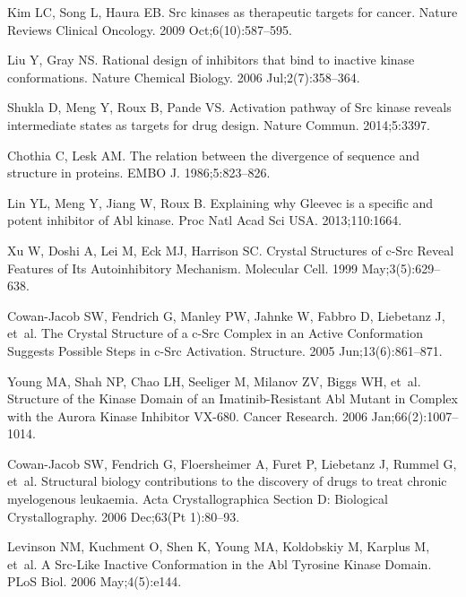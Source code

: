 \documentclass[10pt,letterpaper]{article}
\begin{document}
\begin{thebibliography}{100}
Kim LC, Song L, Haura EB.
\newblock Src kinases as therapeutic targets for cancer.
\newblock Nature Reviews Clinical Oncology. 2009 Oct;6(10):587--595.

Liu Y, Gray NS.
\newblock Rational design of inhibitors that bind to inactive kinase
  conformations.
\newblock Nature Chemical Biology. 2006 Jul;2(7):358--364.

Shukla D, Meng Y, Roux B, Pande VS.
\newblock Activation pathway of {Src} kinase reveals intermediate states as
  targets for drug design.
\newblock Nature Commun. 2014;5:3397.

Chothia C, Lesk AM.
\newblock The relation between the divergence of sequence and structure in
  proteins.
\newblock EMBO J. 1986;5:823--826.

Lin YL, Meng Y, Jiang W, Roux B.
\newblock Explaining why {Gleevec} is a specific and potent inhibitor of {Abl}
  kinase.
\newblock Proc Natl Acad Sci USA. 2013;110:1664.

Xu W, Doshi A, Lei M, Eck MJ, Harrison SC.
\newblock Crystal {Structures} of c-{Src} {Reveal} {Features} of {Its}
  {Autoinhibitory} {Mechanism}.
\newblock Molecular Cell. 1999 May;3(5):629--638.

Cowan-Jacob SW, Fendrich G, Manley PW, Jahnke W, Fabbro D, Liebetanz J, et~al.
\newblock The {Crystal} {Structure} of a c-{Src} {Complex} in an {Active}
  {Conformation} {Suggests} {Possible} {Steps} in c-{Src} {Activation}.
\newblock Structure. 2005 Jun;13(6):861--871.

Young MA, Shah NP, Chao LH, Seeliger M, Milanov ZV, Biggs WH, et~al.
\newblock Structure of the {Kinase} {Domain} of an {Imatinib}-{Resistant} {Abl}
  {Mutant} in {Complex} with the {Aurora} {Kinase} {Inhibitor} {VX}-680.
\newblock Cancer Research. 2006 Jan;66(2):1007--1014.

Cowan-Jacob SW, Fendrich G, Floersheimer A, Furet P, Liebetanz J, Rummel G,
  et~al.
\newblock Structural biology contributions to the discovery of drugs to treat
  chronic myelogenous leukaemia.
\newblock Acta Crystallographica Section D: Biological Crystallography. 2006
  Dec;63(Pt 1):80--93.

Levinson NM, Kuchment O, Shen K, Young MA, Koldobskiy M, Karplus M, et~al.
\newblock A {Src}-{Like} {Inactive} {Conformation} in the {Abl} {Tyrosine}
  {Kinase} {Domain}.
\newblock PLoS Biol. 2006 May;4(5):e144.


\end{thebibliography}
\end{document}
